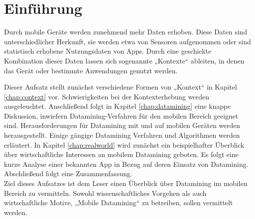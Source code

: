 \chapter{Einführung}

Durch mobile Geräte werden zunehmend mehr Daten erhoben. Diese Daten sind unterschiedlicher Herkunft, sie werden etwa von Sensoren aufgenommen oder sind statistisch erhobene Nutzungsdaten von Apps. Durch eine geschickte Kombination dieser Daten lassen sich sogenannte „Kontexte“ ableiten, in denen das Gerät oder bestimmte Anwendungen genutzt werden.

Dieser Aufsatz stellt zunächst verschiedene Formen von „Kontext“ in Kapitel \ref{chap:context} vor. Schwierigkeiten bei der Kontexterhebung werden ausgeleuchtet. Anschließend folgt in Kapitel \ref{chap:datamining} eine knappe Diskussion, inwiefern Datamining-Verfahren für den mobilen Bereich geeignet sind.  Herausforderungen für Datamining mit und auf mobilen Geräten werden herausgestellt. Einige gängige Datamining Verfahren und Algorithmen werden erläutert. In Kapitel \ref{chap:realworld} wird zunächst ein beispielhafter Überblick über wirtschaftliche Interessen an mobilem Datamining geboten. Es folgt eine kurze Analyse einer bekannten App in Bezug auf deren Einsatz von Datamining. Abschließend folgt eine Zusammenfassung. \\

Ziel dieses Aufsatzes ist dem Leser einen Überblick über Datamining im mobilen Bereich zu vermitteln. Sowohl wissenschaftliches Vorgehen als auch wirtschaftliche Motive, „Mobile Datamining“ zu betreiben, sollen vermittelt werden.

\nocite{*}